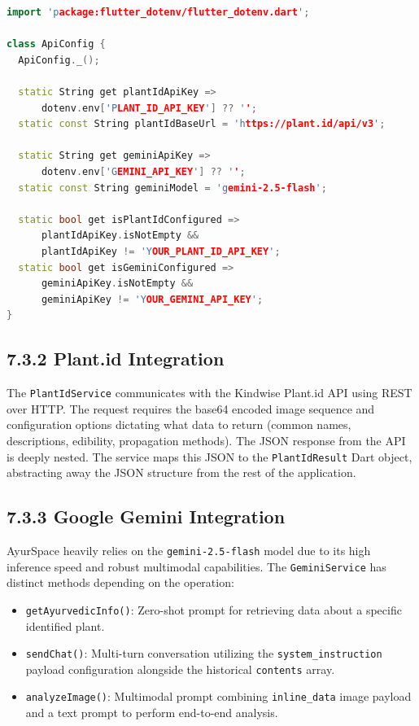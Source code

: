 \documentclass[12pt]{article}
\begin{document}
\begin{lstlisting}[language=C++]
import 'package:flutter_dotenv/flutter_dotenv.dart';

class ApiConfig {
  ApiConfig._();

  static String get plantIdApiKey =>
      dotenv.env['PLANT_ID_API_KEY'] ?? '';
  static const String plantIdBaseUrl = 'https://plant.id/api/v3';

  static String get geminiApiKey =>
      dotenv.env['GEMINI_API_KEY'] ?? '';
  static const String geminiModel = 'gemini-2.5-flash';

  static bool get isPlantIdConfigured =>
      plantIdApiKey.isNotEmpty &&
      plantIdApiKey != 'YOUR_PLANT_ID_API_KEY';
  static bool get isGeminiConfigured =>
      geminiApiKey.isNotEmpty &&
      geminiApiKey != 'YOUR_GEMINI_API_KEY';
}
\end{lstlisting}

\subsection*{7.3.2 \quad Plant.id Integration}
The \texttt{PlantIdService} communicates with the Kindwise Plant.id API using REST over HTTP. The
request requires the base64 encoded image sequence and configuration options dictating what data to
return (common names, descriptions, edibility, propagation methods). The JSON response from the API
is deeply nested. The service maps this JSON to the \texttt{PlantIdResult} Dart object, abstracting
away the JSON structure from the rest of the application.

\subsection*{7.3.3 \quad Google Gemini Integration}
AyurSpace heavily relies on the \texttt{gemini-2.5-flash} model due to its high inference speed
and robust multimodal capabilities. The \texttt{GeminiService} has distinct methods depending on
the operation:
\begin{itemize}
    \item \texttt{getAyurvedicInfo()}: Zero-shot prompt for retrieving data about a specific
    identified plant.
    \item \texttt{sendChat()}: Multi-turn conversation utilizing the \texttt{system\_instruction}
    payload configuration alongside the historical \texttt{contents} array.
    \item \texttt{analyzeImage()}: Multimodal prompt combining \texttt{inline\_data} image payload
    and a text prompt to perform end-to-end analysis.
\end{itemize}
\end{document}
